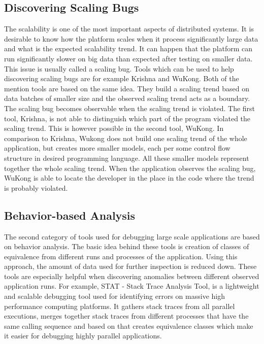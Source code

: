 \subsection{Discovering Scaling Bugs}
The scalability is one of the most important aspects of distributed systems. It is desirable to know how the platform scales when it process significantly large data and what is the expected scalability trend. It can happen that the platform can run significantly slower on big data than expected after testing on smaller data. This issue is usually called a scaling bug. Tools which can be used to help discovering scaling bugs are for example Krishna and WuKong. Both of the mention tools are based on the same idea. They build a scaling trend based on data batches of smaller size and the observed scaling trend acts as a boundary. The scaling bug becomes observable when the scaling trend is violated. The first tool, Krishna, is not able to distinguish which part of the program violated the scaling trend. This is however possible in the second tool, WuKong. In comparison to Krishna, Wukong does not build one scaling trend of the whole application, but creates more smaller models, each per some control flow structure in desired programming language. All these smaller models represent together the whole scaling trend. When the application observes the scaling bug, WuKong is able to locate the developer in the place in the code where the trend is probably violated.

\subsection{Behavior-based Analysis}
The second category of tools used for debugging large scale applications are based on behavior analysis. The basic idea behind these tools is creation of classes of equivalence from different runs and processes of the application. Using this approach, the amount of data used for further inspection is reduced down. These tools are especially helpful when discovering anomalies between different observed application runs. For example, STAT - Stack Trace Analysis Tool, is a lightweight and scalable debugging tool used for identifying errors on massive high performance computing platforms. It gathers stack traces from all parallel executions, merges together stack traces from different processes that have the same calling sequence and based on that creates equivalence classes which make it easier for debugging highly parallel applications. 

